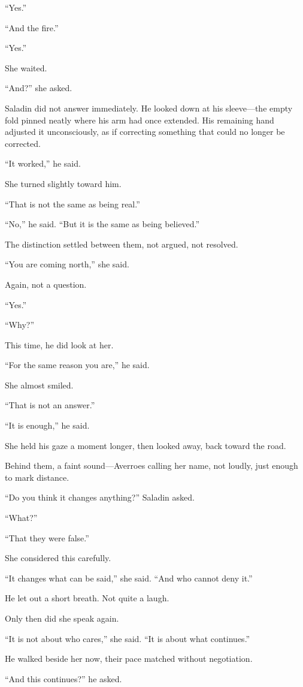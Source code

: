 ``Yes.''

``And the fire.''

``Yes.''

She waited.

``And?'' she asked.

Saladin did not answer immediately. He looked down at his sleeve---the empty fold
pinned neatly where his arm had once extended. His remaining hand adjusted it
unconsciously, as if correcting something that could no longer be corrected.

``It worked,'' he said.

She turned slightly toward him.

``That is not the same as being real.''

``No,'' he said. ``But it is the same as being believed.''

The distinction settled between them, not argued, not resolved.

``You are coming north,'' she said.

Again, not a question.

``Yes.''

``Why?''

This time, he did look at her.

``For the same reason you are,'' he said.

She almost smiled.

``That is not an answer.''

``It is enough,'' he said.

She held his gaze a moment longer, then looked away, back toward the road.

Behind them, a faint sound---Averroes calling her name, not loudly, just enough to
mark distance.

``Do you think it changes anything?'' Saladin asked.

``What?''

``That they were false.''

She considered this carefully.

``It changes what can be said,'' she said. ``And who cannot deny it.''

He let out a short breath. Not quite a laugh.

Only then did she speak again.

``It is not about who cares,'' she said. ``It is about what continues.''

He walked beside her now, their pace matched without negotiation.

``And this continues?'' he asked.

